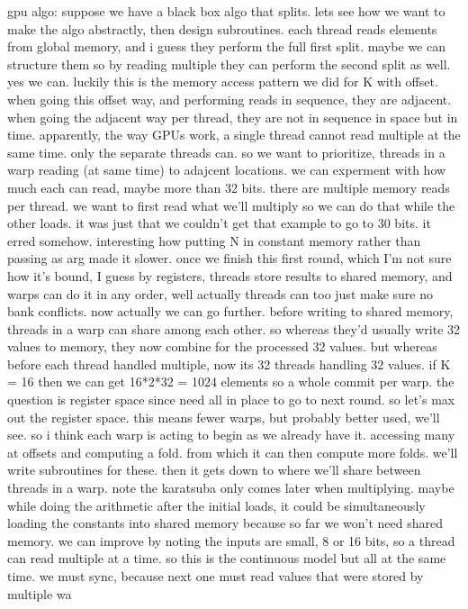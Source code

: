 gpu algo:
suppose we have a black box algo that splits.
lets see how we want to make the algo abstractly, then design subroutines. 
each thread reads elements from global memory, and i guess they perform the full first split.
maybe we can structure them so by reading multiple they can perform the second split as well. yes we can. luckily this is the memory access pattern we did for K with offset.
when going this offset way, and performing reads in sequence, they are adjacent. 
when going the adjacent way per thread, they are not in sequence in space but in time.
apparently, the way GPUs work, a single thread cannot read multiple at the same time. only the separate threads can.
so we want to prioritize, threads in a warp reading (at same time) to adajcent locations. we can experment with how much each can read, maybe more than 32 bits. 
there are multiple memory reads per thread. we want to first read what we'll multiply so we can do that while the other loads. it was just that we couldn't get that example to go to 30 bits. it erred somehow. 
interesting how putting N in constant memory rather than passing as arg made it slower. 
once we finish this first round, which I'm not sure how it's bound, I guess by registers, threads store results to shared memory, and warps can do it in any order, well actually threads can too just make sure no bank conflicts. 
now actually we can go further. before writing to shared memory, threads in a warp can share among each other. so whereas they'd usually write 32 values to memory, they now combine for the processed 32 values. but whereas before each thread handled multiple, now its 32 threads handling 32 values. if K = 16 then we can get 16*2*32 = 1024 elements so a whole commit per warp. the question is register space since need all in place to go to next round. so let's max out the register space. this means fewer warps, but probably better used, we'll see. 
so i think each warp is acting to begin as we already have it. accessing many at offsets and computing a fold. from which it can then compute more folds. we'll write subroutines for these. then it gets down to where we'll share between threads in a warp. note the karatsuba only comes later when multiplying. maybe while doing the arithmetic after the initial loads, it could be simultaneously loading the constants into shared memory because so far we won't need shared memory. 
we can improve by noting the inputs are small, 8 or 16 bits, so a thread can read multiple at a time. so this is the continuous model but all at the same time. 
we must sync, because next one must read values that were stored by multiple wa
